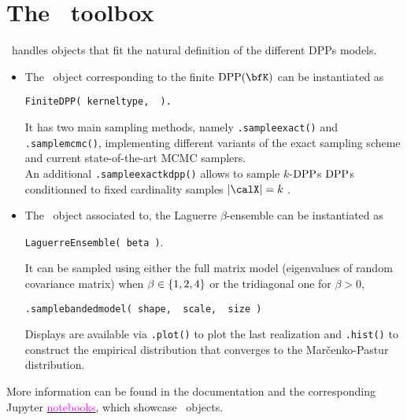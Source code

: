 \section{The \DPPy\ toolbox} %
\label{sec:the_dppy_toolbox}

  \DPPy\ handles objects that fit the natural definition of the different DPPs models.
  \begin{itemize}
	  \item The \DPPy\ object corresponding to the finite $\DPP(\bfK)$ can be instantiated as
    \begin{nscenter}
      \texttt{FiniteDPP(%
        kernel\pyus type\pyeq{},\,%
        \pykwargs{}%
        ).}
    \end{nscenter}
    It has two main sampling methods, namely \texttt{.sample\pyus exact()} and \texttt{.sample\pyus mcmc()}, implementing different variants of the exact sampling scheme and current state-of-the-art MCMC samplers.\\
    An additional \texttt{.sample\pyus exact\pyus k\pyus dpp()} allows to sample $k$-$\operatorname{DPP}$s \ie $\operatorname{DPP}$s conditionned to fixed cardinality samples $|\calX|=k$ \citep[Section 5]{KuTa12}.

		\item The \DPPy\ object associated to, \eg the Laguerre $\beta$-ensemble can be instantiated as
    \begin{nscenter}
      \texttt{LaguerreEnsemble(%
         beta\pyeq{}%
         )}.
    \end{nscenter}
    It can be sampled using either the full matrix model (eigenvalues of random covariance matrix) when $\beta\in\left\{ 1,2,4 \right\}$ or the tridiagonal one for $\beta > 0$,
    \begin{nscenter}
      \texttt{.sample\pyus banded\pyus model(%
          shape\pyeq{},\,%
          scale\pyeq{},\,%
          size\pyeq{}%
        )}
    \end{nscenter}
    Displays are available via \texttt{.plot()} to plot the last realization and \texttt{.hist()} to construct the empirical distribution that converges to the Mar\v{c}enko-Pastur distribution.
  \end{itemize}
  More information can be found in the documentation and the corresponding Jupyter \href{https://github.com/guilgautier/DPPy/tree/master/notebooks}{\textcolor{magenta}{notebooks}}, which showcase \DPPy\ objects.

